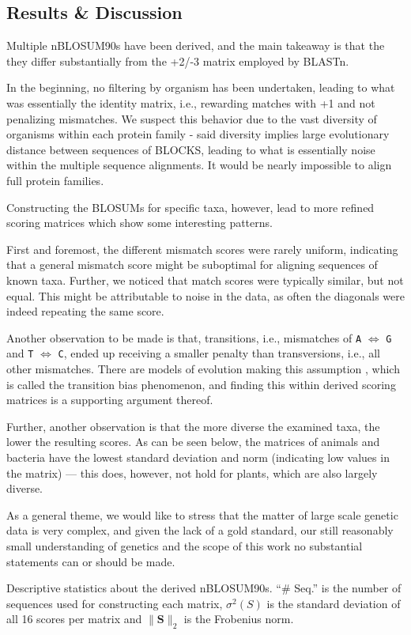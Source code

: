 \documentclass{article}
\begin{document}
\subsection{Results \& Discussion}	
	Multiple nBLOSUM90s have been derived, and the main takeaway is that the they differ substantially from the +2/-3 matrix employed by BLASTn. 	

	In the beginning, no filtering by organism has been undertaken, leading 
	to what was essentially the identity matrix, i.e., rewarding matches
	with +1 and not penalizing mismatches. We suspect this behavior due to
	the vast diversity of organisms within each protein family - said
	diversity implies large evolutionary distance between sequences of
	BLOCKS, leading to what is essentially noise within the multiple
	sequence alignments. It would be nearly impossible to align full
	protein families.
	
	Constructing the BLOSUMs for specific taxa, however, lead to
	more refined scoring matrices which show some interesting patterns.

	First and foremost, the different mismatch scores were rarely uniform, indicating that a general mismatch score might be suboptimal for aligning sequences of known taxa. 	Further, we noticed that match scores were typically similar, but not
	equal. This might be attributable to noise in the data, as
	often the diagonals were indeed repeating the same score. 

	Another observation to be made is that, transitions,
	i.e., mismatches of \texttt{A} $\iff$ \texttt{G} and \texttt{T}
	$\iff$ \texttt{C}, ended up receiving a smaller penalty than
	transversions, i.e., all other mismatches. There are models of
	evolution making this assumption \cite{kimuraEstimationEvolutionaryDistances1981}, which is called
	the transition bias phenomenon, and
	finding this within derived scoring matrices is a supporting argument thereof.

	Further, another observation is that the more diverse the examined taxa,
	the lower the resulting scores. As can be seen below,
	the matrices of animals and bacteria have the lowest standard deviation and norm (indicating low values in the matrix) --- this does, however, not hold for plants, which are also largely diverse. 
	
As a general theme, we would like to stress that the matter of large scale
genetic data is very complex, and given the lack of a gold standard, our still
reasonably small understanding of genetics and the scope of this work no
substantial statements can or should be made.
	\begin{table}[h] 
		
		\caption{Descriptive statistics about the derived nBLOSUM90s.
			``\# Seq.'' is the number of sequences used for
			constructing each matrix, $\sigma^2(S)$
is the standard deviation of all 16 scores per matrix and $\| \mathbf S\|_2$ is the Frobenius norm.}
	\end{table}
\end{document}
